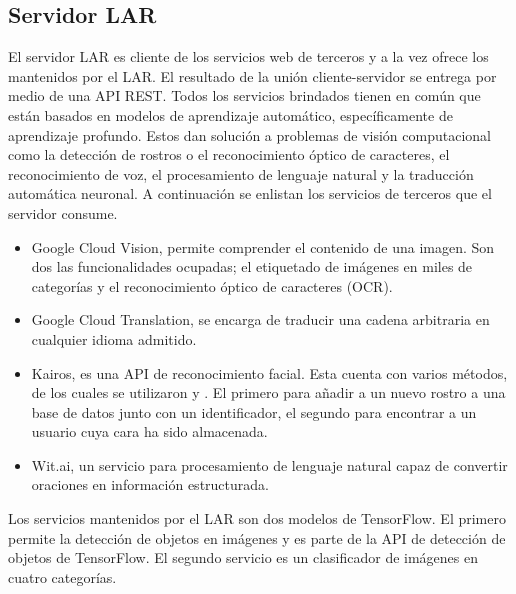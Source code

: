 


\subsection{Servidor LAR}
\label{\detokenize{chapter_two/desc_cloudnao:servidor-lar}}
El servidor LAR es cliente de los servicios web de terceros y a la vez
ofrece los mantenidos por el LAR.
El resultado de la unión cliente-servidor se
entrega por medio de una
API REST.
Todos los servicios brindados tienen en común que están basados en modelos de
aprendizaje automático, específicamente de aprendizaje profundo. Estos dan solución
a problemas de visión computacional como la detección de rostros o el
reconocimiento óptico de caracteres, el reconocimiento
de voz, el procesamiento de lenguaje natural y la traducción automática
neuronal. A continuación se enlistan los servicios de terceros que el servidor
consume.
\begin{itemize}
\item {} 
Google Cloud Vision, permite comprender el contenido de una imagen. Son dos las funcionalidades ocupadas; el etiquetado de imágenes en miles de categorías y el reconocimiento óptico de caracteres (OCR).


\item {} 
Google Cloud Translation, se encarga de traducir una cadena arbitraria en cualquier idioma admitido.

\item {} 
Kairos, es una API de reconocimiento facial. Esta cuenta con varios métodos, de los cuales se utilizaron  y . El primero para añadir a un nuevo rostro a una base de datos junto con un identificador, el segundo para encontrar a un usuario cuya cara ha sido almacenada.

\item {} 
Wit.ai, un servicio para procesamiento de lenguaje natural capaz de convertir oraciones en información estructurada.

\end{itemize}

Los servicios mantenidos por el LAR son dos modelos de TensorFlow.
El primero permite la detección de objetos en imágenes y es parte
de la API de detección de objetos de TensorFlow. El segundo
servicio es un clasificador de imágenes en cuatro categorías.

